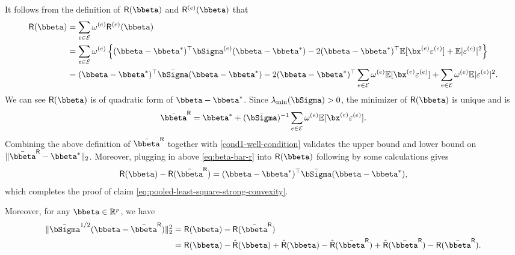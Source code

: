 \documentclass[10pt]{article}
\numberwithin{equation}{section}
\begin{document}
It follows from the definition of $\mathsf{R}(\bbeta)$ and $\mathsf{R}^{(e)}(\bbeta)$ that
\begin{align*}
    \mathsf{R}(\bbeta) &= \sum_{e\in \mathcal{E}} \omega^{(e)} \mathsf{R}^{(e)}(\bbeta) \\
    &= \sum_{e\in \mathcal{E}} \omega^{(e)} \left\{(\bbeta - \bbeta^*)^\top \bSigma^{(e)} (\bbeta - \bbeta^*) - 2(\bbeta - \bbeta^*)^\top \mathbb{E}[\bx^{(e)} \varepsilon^{(e)}] + \mathbb{E} |\varepsilon^{(e)}|^2 \right\}\\
    &= (\bbeta - \bbeta^*)^\top \bar{\bSigma} (\bbeta - \bbeta^*) - 2(\bbeta - \bbeta^*)^\top \sum_{e\in \mathcal{E}} \omega^{(e)} \mathbb{E} [\bx^{(e)} \varepsilon^{(e)}] + \sum_{e\in \mathcal{E}} \omega^{(e)} \mathbb{E} |\varepsilon^{(e)}|^2.
\end{align*}
We can see $\mathsf{R}(\bbeta)$ is of quadratic form of $\bbeta - \bbeta^*$. Since $\lambda_{\min}(\bSigma) > 0$, the minimizer of $\mathsf{R}(\bbeta)$ is unique and is
\begin{align}
\label{eq:beta-bar-r}
    \bar{\bbeta}^{\mathsf{R}} = \bbeta^* + (\bar{\bSigma})^{-1} \sum_{e\in \mathcal{E}} \omega^{(e)} \mathbb{E}[\bx^{(e)} \varepsilon^{(e)}].
\end{align}
Combining the above definition of $\bar{\bbeta}^{\mathsf{R}}$ together with \cref{cond1-well-condition} validates the upper bound and lower bound on $\|\bar{\bbeta}^{\mathsf{R}}-\bbeta^*\|_2$. Moreover, plugging in above \eqref{eq:beta-bar-r} into $\mathsf{R}(\bbeta)$ following by some calculations gives
\begin{align*}
    \mathsf{R}(\bbeta) - \mathsf{R}(\bar{\bbeta}^{\mathsf{R}}) = (\bbeta - \bbeta^*)^\top \bar{\bSigma} (\bbeta - \bbeta^*),
\end{align*} which completes the proof of claim \eqref{eq:pooled-least-square-strong-convexity}.

Moreover, for any $\bbeta \in \mathbb{R}^p$, we have
\begin{align*}
    \|\bar{\bSigma}^{1/2}(\bbeta - \bar{\bbeta}^{\mathsf{R}})\|_2^2 &= \mathsf{R}(\bbeta) - \mathsf{R}(\bar{\bbeta}^{\mathsf{R}}) \\
    &= \mathsf{R}(\bbeta) - \hat{\mathsf{R}}(\bbeta) + \hat{\mathsf{R}}(\bbeta) - \hat{\mathsf{R}}(\bar{\bbeta}^{\mathsf{R}}) + \hat{\mathsf{R}}(\bar{\bbeta}^{\mathsf{R}}) - \mathsf{R}(\bar{\bbeta}^{\mathsf{R}}).
\end{align*}
\end{document}
